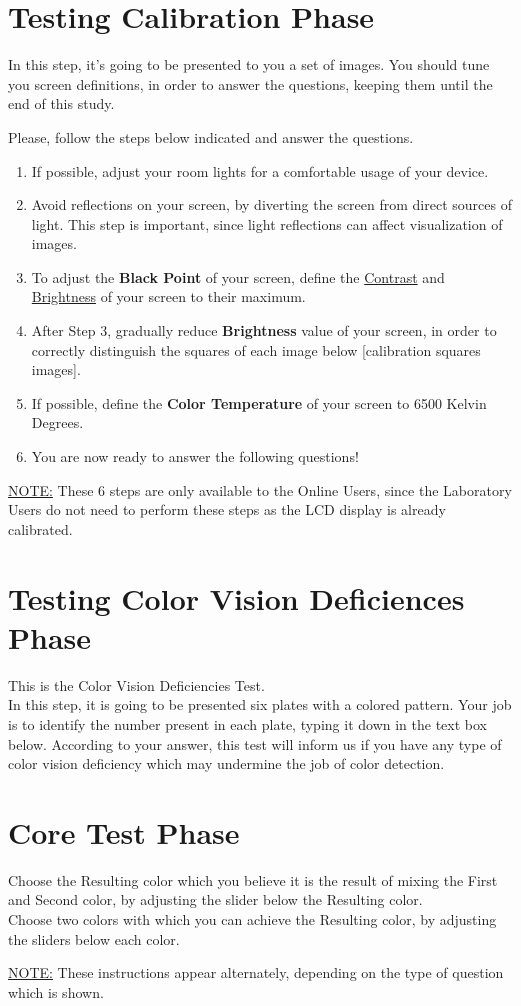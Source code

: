 \section{Testing Calibration Phase}
%
In this step, it's going to be presented to you a set of images. You should tune you screen definitions, in
order to answer the questions, keeping them until the end of this study. \par
%
Please, follow the steps below indicated and answer the questions.
%
\begin{enumerate}
  \item If possible, adjust your room lights for a comfortable usage of your device.
  \item Avoid reflections on your screen, by diverting the screen from direct sources of light. This step is important,
  since light reflections can affect visualization of images.
  \item To adjust the \textbf{Black Point} of your screen, define the \ul{Contrast} and \ul{Brightness} of your screen to their maximum.
  \item After Step 3, gradually reduce \textbf{Brightness} value of your screen, in order to correctly distinguish the squares of each image below [calibration squares images].
  \item If possible, define the \textbf{Color Temperature} of your screen to 6500 Kelvin Degrees.
  \item You are now ready to answer the following questions!
\end{enumerate} \par
%
\ul{NOTE:} These 6 steps are only available to the Online Users, since the Laboratory Users
do not need to perform these steps as the LCD display is already calibrated.
%
\section{Testing Color Vision Deficiences Phase}
%
This is the Color Vision Deficiencies Test. \\
%
In this step, it is going to be presented six plates with a colored pattern. Your job is to
identify the number present in each plate, typing it down in the text box below. According
to your answer, this test will inform us if you have any type of color vision deficiency which
may undermine the job of color detection. \\
%
\section{Core Test Phase}
%
Choose the Resulting color which you believe it is the result of mixing the First and Second color, by adjusting the slider below the Resulting color. \\
%
Choose two colors with which you can achieve the Resulting color, by adjusting the sliders below each color. \par
%
\ul{NOTE:} These instructions appear alternately, depending on the type of question which is shown.
%
